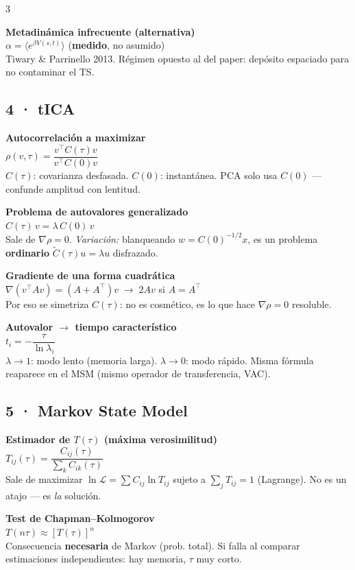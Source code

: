 \documentclass[9pt]{extarticle}
\newcommand{\F}[2]{%
  \par\noindent\textbf{\color{miazul}#1}\\[-0.15em]
  #2\\[0.35em]
}
\begin{document}
\begin{multicols}{3}
\F{Metadinámica infrecuente (alternativa)}{
$\alpha=\langle e^{\beta V(s,t)}\rangle$ (\textbf{medido}, no asumido)\\
{\scriptsize Tiwary \& Parrinello 2013. Régimen opuesto al del paper: depósito espaciado para no contaminar el TS.}}

\subsection*{\small 4 · tICA}

\F{Autocorrelación a maximizar}{
$\rho(v,\tau)=\dfrac{v^\top C(\tau) v}{v^\top C(0) v}$\\
{\scriptsize $C(\tau)$: covarianza desfasada. $C(0)$: instantánea. PCA solo usa $C(0)$ — confunde amplitud con lentitud.}}

\F{Problema de autovalores generalizado}{
$C(\tau)\,v=\lambda\,C(0)\,v$\\
{\scriptsize Sale de $\nabla\rho=0$. \emph{Variación:} blanqueando $w=C(0)^{-1/2}x$, es un problema \textbf{ordinario} $\tilde C(\tau)u=\lambda u$ disfrazado.}}

\F{Gradiente de una forma cuadrática}{
$\nabla(v^\top Av)=(A+A^\top)v \;\to\; 2Av$ si $A=A^\top$\\
{\scriptsize Por eso se simetriza $C(\tau)$: no es cosmético, es lo que hace $\nabla\rho=0$ resoluble.}}

\F{Autovalor $\to$ tiempo característico}{
$t_i=-\dfrac{\tau}{\ln\lambda_i}$\\
{\scriptsize $\lambda\to1$: modo lento (memoria larga). $\lambda\to0$: modo rápido. Misma fórmula reaparece en el MSM (mismo operador de transferencia, VAC).}}

\subsection*{\small 5 · Markov State Model}

\F{Estimador de $T(\tau)$ (máxima verosimilitud)}{
$T_{ij}(\tau)=\dfrac{C_{ij}(\tau)}{\sum_k C_{ik}(\tau)}$\\
{\scriptsize Sale de maximizar $\ln\mathcal L=\sum C_{ij}\ln T_{ij}$ sujeto a $\sum_j T_{ij}=1$ (Lagrange). No es un atajo — es \emph{la} solución.}}

\F{Test de Chapman--Kolmogorov}{
$T(n\tau)\approx[T(\tau)]^n$\\
{\scriptsize Consecuencia \textbf{necesaria} de Markov (prob. total). Si falla al comparar estimaciones independientes: hay memoria, $\tau$ muy corto.}}


\end{multicols}
\end{document}
